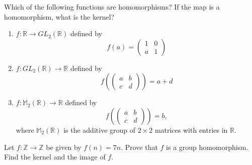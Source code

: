 \begin{exercise}{}
Which of the following functions are homomorphisms? If the map is a
homomorphism, what is the kernel? 
\begin{enumerate}
 
 
\item
$f : {\mathbb R} \rightarrow GL_2 ( {\mathbb R})$ defined by
\[
f( a ) =
\left(
\begin{array}{cc}
1 & 0 \\
a & 1
\end{array}
\right)
\]
 
\item
$f : GL_2 ({\mathbb R})   \rightarrow {\mathbb R}$ defined by
\[
f
\left(
\left(
\begin{array}{cc}
a & b \\
c & d
\end{array}
\right)
\right)
= a + d
\]
 
 
\item
$f : {\mathbb M}_2( {\mathbb R})   \rightarrow {\mathbb R}$ defined by
\[
f
\left(
\left(
\begin{array}{cc}
a & b \\
c & d
\end{array}
\right)
\right)
= b,
\]
where ${\mathbb M}_2( {\mathbb R})$ is the additive group of $2 \times
2$ matrices with entries in ${\mathbb R}$.
 
\end{enumerate}
\end{exercise}

\begin{exercise}{}
Let $f : {\mathbb Z} \rightarrow {\mathbb Z}$ be given by $f(n) = 7n$.
Prove that $f$ is a group homomorphism. Find the kernel and the
image of $f$.
\end{exercise} 
 
